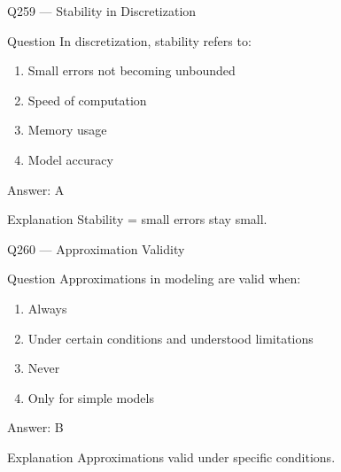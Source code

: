 \documentclass[aspectratio=169,8pt]{beamer}
\begin{document}
								\begin{frame}{Q259 --- Stability in Discretization}
									\begin{block}{Question}
										In discretization, stability refers to:
										\begin{enumerate}
											\item Small errors not becoming unbounded
											\item Speed of computation
											\item Memory usage
											\item Model accuracy
										\end{enumerate}
									\end{block}
									\begin{exampleblock}{Answer: A}\end{exampleblock}
									\begin{block}{Explanation}
										Stability = small errors stay small.
									\end{block}
								\end{frame}
								
								\begin{frame}{Q260 --- Approximation Validity}
									\begin{block}{Question}
										Approximations in modeling are valid when:
										\begin{enumerate}
											\item Always
											\item Under certain conditions and understood limitations
											\item Never
											\item Only for simple models
										\end{enumerate}
									\end{block}
									\begin{exampleblock}{Answer: B}\end{exampleblock}
									\begin{block}{Explanation}
										Approximations valid under specific conditions.
									\end{block}
								\end{frame}
								
\end{document}

